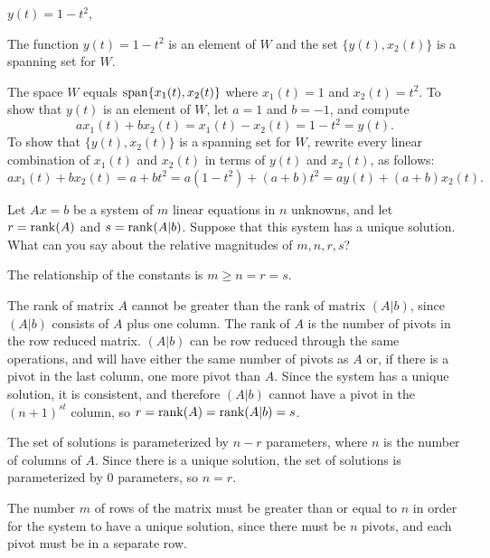 \documentclass{ximera}
\begin{document}
\begin{exercise} \label{c5.2.6a}
$y(t) = 1-t^2$,

\begin{solution}

\ans The function $y(t) = 1 - t^2$ is an element of $W$ and the set
$\{y(t),x_2(t)\}$ is a spanning set for $W$.



\soln The space $W$ equals ${\rm span}\{x_1(t),x_2(t)\}$ where $x_1(t)=1$ and 
$x_2(t)=t^2$.  To show that $y(t)$ is an element of $W$, let
$a = 1$ and $b = -1$, and compute
\[
ax_1(t) + bx_2(t) = x_1(t) - x_2(t) = 1 - t^2 = y(t). 
\]
To show that $\{y(t),x_2(t)\}$ is a spanning set for $W$, rewrite every
linear combination of $x_1(t)$ and $x_2(t)$ in terms of $y(t)$ and $x_2(t)$, 
as follows:
\[ 
ax_1(t) + bx_2(t) = a + bt^2 = a(1 - t^2) + (a + b)t^2
= ay(t) + (a + b)x_2(t). 
\]

\end{solution}
\end{exercise}




\problemlabel

\begin{exercise} \label{c5.2.10}
Let $Ax=b$ be a system of $m$ linear equations in $n$ unknowns,
and let $r={\rm rank}(A)$ and $s={\rm rank}(A|b)$.  Suppose that this system
has a unique solution.  What can you say about the relative
magnitudes of $m,n,r,s$?

\begin{solution}

\ans The relationship of the constants is $m \geq n = r = s$.

\soln The rank of matrix $A$ cannot be greater than the rank of matrix
$(A|b)$, since $(A|b)$ consists of $A$ plus one column.  The rank of $A$
is the number of pivots in the row reduced matrix.  $(A|b)$ can be row 
reduced through the same operations, and will have either the same number
of pivots as $A$ or, if there is a pivot in the last column, one more
pivot than $A$.  Since the system has a unique solution, it is consistent,
and therefore $(A|b)$ cannot have a pivot in the $(n + 1)^{st}$ column, so
$r = {\rm rank}(A) = {\rm rank}(A|b) = s$.

\para The set of solutions is parameterized by $n - r$ parameters,
where $n$ is the number of columns of $A$.  Since there is a unique
solution, the set of solutions is parameterized by $0$ parameters,
so $n = r$.

\para The number $m$ of rows of the matrix must be greater than or
equal to $n$ in order for the system to have a unique solution, since
there must be $n$ pivots, and each pivot must be in a separate row.



\end{solution}
\end{exercise}


\end{document}
